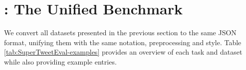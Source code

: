 \section{{\DATASET}: The Unified Benchmark}
We convert all datasets presented in the previous section to the same JSON format, unifying them with the same notation, preprocessing and style. Table \ref{tab:SuperTweetEval-examples} provides an overview of each task and dataset while also providing example entries.


